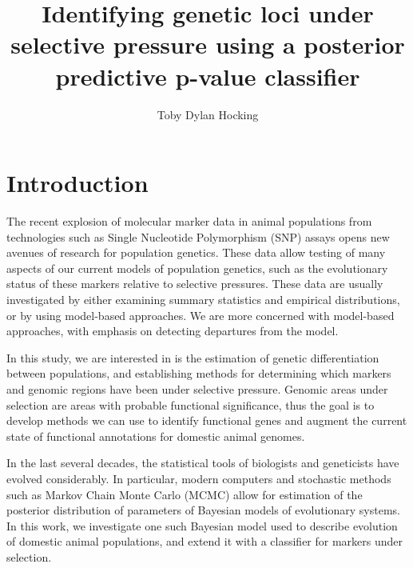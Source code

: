 \documentclass[a4paper,12pt]{article}
\title{Identifying genetic loci under selective pressure using a
  posterior predictive p-value classifier} \author{Toby Dylan Hocking}
\begin{document}
\maketitle
\tableofcontents
\newpage
\listoffigures
\newpage

\newcommand{\fig}[3][1]{
  \begin{figure}[htp]
    \begin{center}          %
    \texttt{[image: \#2]}
    \end{center}
    \caption{#3\label{#2}}
  \end{figure}
}
\newcommand{\brat}[2]{
  \left[
    \begin{array}{#1}
      #2
    \end{array}
    \right]
}
\newcommand{\aij}{\alpha_{ij}(t)}
\newcommand{\aijs}{\alpha_{ij}^*(t)}
\newcommand{\wij}[1]{w_{ij}^{\text{#1}}}
\newcommand{\etal}{\emph{et al.}}
\newcommand{\RR}{\mathbb R}
\newcommand{\Bin}{\operatorname{Binomial}}

\section{Introduction}

The recent explosion of molecular marker data in animal populations
from technologies such as Single Nucleotide Polymorphism (SNP) assays
opens new avenues of research for population genetics. These data
allow testing of many aspects of our current models of population
genetics, such as the evolutionary status of these markers relative to
selective pressures. These data are usually investigated by either
examining summary statistics and empirical distributions, or by using
model-based approaches. We are more concerned with model-based
approaches, with emphasis on detecting departures from the model.

In this study, we are interested in is the estimation of genetic
differentiation between populations, and establishing methods for
determining which markers and genomic regions have been under
selective pressure. Genomic areas under selection are areas with
probable functional significance, thus the goal is to develop methods
we can use to identify functional genes and augment the current state
of functional annotations for domestic animal genomes.

In the last several decades, the statistical tools of biologists and
geneticists have evolved considerably. In particular, modern computers
and stochastic methods such as Markov Chain Monte Carlo (MCMC) allow
for estimation of the posterior distribution of parameters of Bayesian
models of evolutionary systems. In this work, we investigate one such
Bayesian model used to describe evolution of domestic animal
populations, and extend it with a classifier for markers under
selection.
\end{document}
